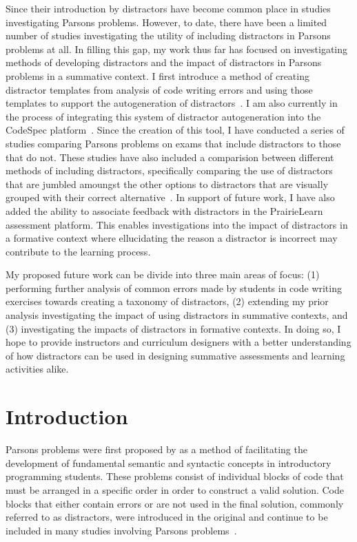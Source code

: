 \documentclass[authorversion,nonacm]{acmart}
\begin{document}
Since their introduction by \citet{parsons2006parson} distractors have become
common place in studies investigating Parsons problems. However, to date, there
have been a limited number of studies investigating the utility of including
distractors in Parsons problems at all. In filling this gap, my work thus far
has focused on investigating methods of developing distractors and the impact
of distractors in Parsons problems in a summative context. I first introduce a
method of creating distractor templates from analysis of code writing errors
and using those templates to support the autogeneration of
distractors~\cite{smith2023discovering}. I am also currently in the process of
integrating this system of distractor autogeneration into the CodeSpec
platform~\cite{haynes2022codespec}. Since the creation of this tool, I have
conducted a series of studies comparing Parsons problems on exams that include
distractors to those that do not. These studies have also included a comparision
between different methods of including distractors, specifically comparing the
use of distractors that are jumbled amoungst the other options to distractors
that are visually grouped with their correct
alternative~\cite{smith2023investigating, smith2023comparing}.  In support of 
future work, I have also added the ability to associate feedback with distractors
in the PrairieLearn assessment platform. This enables investigations into the
impact of distractors in a formative context where ellucidating the reason a
distractor is incorrect may contribute to the learning process.


My proposed future work can be divide into three main areas of focus: (1)
performing further analysis of common errors made by students in code
writing exercises towards creating a taxonomy of distractors, (2) extending
my prior analysis investigating the impact of using distractors in summative
contexts, and (3) investigating the impacts of distractors in formative contexts.
In doing so, I hope to provide instructors and curriculum designers with a
better understanding of how distractors can be used in designing summative
assessments and learning activities alike.

\section{Introduction}

Parsons problems were first proposed by \citet{parsons2006parson} as a method
of facilitating the development of fundamental semantic and syntactic concepts
in introductory programming students. These problems consist of individual
blocks of code that must be arranged in a specific order in order to construct
a valid solution. Code blocks that either contain errors or are not used in the
final solution, commonly referred to as distractors, were introduced in the
original and continue to be included in many studies involving Parsons
problems~\cite{du2020review}.  
\end{document}

